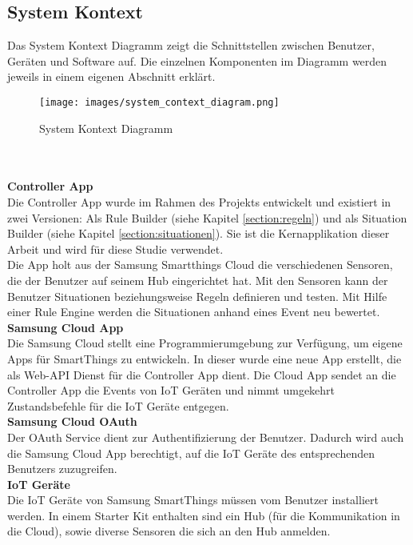 \subsection{System Kontext}
Das System Kontext Diagramm zeigt die Schnittstellen zwischen Benutzer, Geräten und Software auf. Die einzelnen Komponenten im Diagramm werden jeweils in einem eigenen Abschnitt erklärt.
%
\begin{figure}[ht]
  \begin{center}
    \texttt{[image: images/system\_context\_diagram.png]}
    \caption[System Kontext Diagramm2]{System Kontext Diagramm}
    \label{fig:system_context_diagram}
  \end{center}
\end{figure}
\\
\\
\textbf{Controller App} \\
Die Controller App wurde im Rahmen des Projekts entwickelt und existiert in zwei Versionen: Als Rule Builder (siehe Kapitel \ref{section:regeln}) und als Situation Builder (siehe Kapitel \ref{section:situationen}). Sie ist die Kernapplikation dieser Arbeit und wird für diese Studie verwendet.\\
Die App holt aus der Samsung Smartthings Cloud die verschiedenen Sensoren, die der Benutzer auf seinem Hub eingerichtet
hat. Mit den Sensoren kann der Benutzer Situationen beziehungsweise Regeln definieren und testen. Mit Hilfe einer Rule Engine werden
die Situationen anhand eines Event neu bewertet.\\[2ex]
%
\textbf{Samsung Cloud App} \\
Die Samsung Cloud stellt eine Programmierumgebung zur Verfügung, um eigene Apps für SmartThings zu entwickeln. In dieser wurde eine neue App erstellt, die als Web-API Dienst für die Controller App dient. Die Cloud App sendet an die Controller App die Events von IoT Geräten und nimmt umgekehrt Zustandsbefehle für die IoT Geräte entgegen.\\[2ex]
\textbf{Samsung Cloud OAuth} \\
Der OAuth Service dient zur Authentifizierung der Benutzer. Dadurch wird auch die Samsung Cloud App berechtigt, auf die IoT Geräte des entsprechenden Benutzers zuzugreifen.\\[2ex]
%
\textbf{IoT Geräte}\\
Die IoT Geräte von Samsung SmartThings müssen vom Benutzer installiert werden. In einem Starter Kit enthalten sind ein Hub (für die Kommunikation in die Cloud), sowie diverse Sensoren die sich an den Hub anmelden.\\[2ex]
